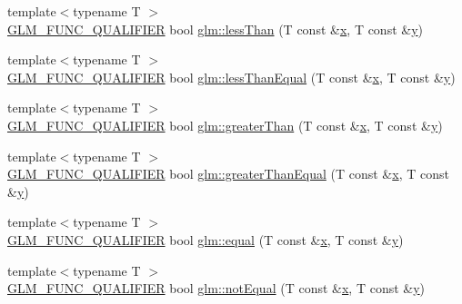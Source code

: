 \begin{DoxyCompactItemize}
\item 
{\footnotesize template$<$typename T $>$ }\\\hyperlink{setup_8hpp_a33fdea6f91c5f834105f7415e2a64407}{G\+L\+M\+\_\+\+F\+U\+N\+C\+\_\+\+Q\+U\+A\+L\+I\+F\+I\+ER} bool \hyperlink{namespaceglm_a6f2a3cef357dbf21b5fc90aded289ba1}{glm\+::less\+Than} (T const \&\hyperlink{_s_d_l__opengl_8h_ad0e63d0edcdbd3d79554076bf309fd47}{x}, T const \&\hyperlink{_s_d_l__opengl_8h_a1675d9d7bb68e1657ff028643b4037e3}{y})
\item 
{\footnotesize template$<$typename T $>$ }\\\hyperlink{setup_8hpp_a33fdea6f91c5f834105f7415e2a64407}{G\+L\+M\+\_\+\+F\+U\+N\+C\+\_\+\+Q\+U\+A\+L\+I\+F\+I\+ER} bool \hyperlink{namespaceglm_a299eb11fb67637d37144dc0fcc6c6ff3}{glm\+::less\+Than\+Equal} (T const \&\hyperlink{_s_d_l__opengl_8h_ad0e63d0edcdbd3d79554076bf309fd47}{x}, T const \&\hyperlink{_s_d_l__opengl_8h_a1675d9d7bb68e1657ff028643b4037e3}{y})
\item 
{\footnotesize template$<$typename T $>$ }\\\hyperlink{setup_8hpp_a33fdea6f91c5f834105f7415e2a64407}{G\+L\+M\+\_\+\+F\+U\+N\+C\+\_\+\+Q\+U\+A\+L\+I\+F\+I\+ER} bool \hyperlink{namespaceglm_ae567b870c79fb61cf069d489133eaf48}{glm\+::greater\+Than} (T const \&\hyperlink{_s_d_l__opengl_8h_ad0e63d0edcdbd3d79554076bf309fd47}{x}, T const \&\hyperlink{_s_d_l__opengl_8h_a1675d9d7bb68e1657ff028643b4037e3}{y})
\item 
{\footnotesize template$<$typename T $>$ }\\\hyperlink{setup_8hpp_a33fdea6f91c5f834105f7415e2a64407}{G\+L\+M\+\_\+\+F\+U\+N\+C\+\_\+\+Q\+U\+A\+L\+I\+F\+I\+ER} bool \hyperlink{namespaceglm_a03e93d49cec76267c3e11fd68381639a}{glm\+::greater\+Than\+Equal} (T const \&\hyperlink{_s_d_l__opengl_8h_ad0e63d0edcdbd3d79554076bf309fd47}{x}, T const \&\hyperlink{_s_d_l__opengl_8h_a1675d9d7bb68e1657ff028643b4037e3}{y})
\item 
{\footnotesize template$<$typename T $>$ }\\\hyperlink{setup_8hpp_a33fdea6f91c5f834105f7415e2a64407}{G\+L\+M\+\_\+\+F\+U\+N\+C\+\_\+\+Q\+U\+A\+L\+I\+F\+I\+ER} bool \hyperlink{namespaceglm_a9943cfbeef0a00a2becb541e9e3818ed}{glm\+::equal} (T const \&\hyperlink{_s_d_l__opengl_8h_ad0e63d0edcdbd3d79554076bf309fd47}{x}, T const \&\hyperlink{_s_d_l__opengl_8h_a1675d9d7bb68e1657ff028643b4037e3}{y})
\item 
{\footnotesize template$<$typename T $>$ }\\\hyperlink{setup_8hpp_a33fdea6f91c5f834105f7415e2a64407}{G\+L\+M\+\_\+\+F\+U\+N\+C\+\_\+\+Q\+U\+A\+L\+I\+F\+I\+ER} bool \hyperlink{namespaceglm_ab4ee9100dc2b4e41ef91ff6898f979e2}{glm\+::not\+Equal} (T const \&\hyperlink{_s_d_l__opengl_8h_ad0e63d0edcdbd3d79554076bf309fd47}{x}, T const \&\hyperlink{_s_d_l__opengl_8h_a1675d9d7bb68e1657ff028643b4037e3}{y})

\end{DoxyCompactItemize}
